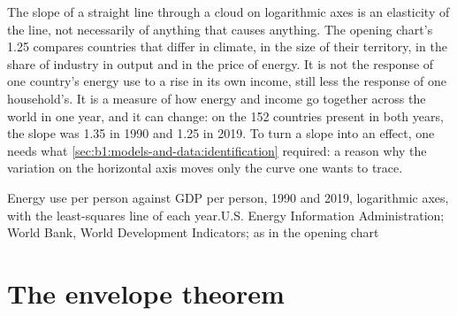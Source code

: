 \begin{measure}
The slope of a straight line through a cloud on logarithmic axes is an
elasticity of the line, not necessarily of anything that causes anything.
The opening chart's 1.25 compares countries that differ in climate, in the
size of their territory, in the share of industry in output and in the price
of energy. %
It is not the response of one country's energy use to a rise in its own
income, still less the response of one household's. It is a measure of how
energy and income go together across the world in one year, and it can
change: on the 152 countries present in both years, the slope was 1.35 in
1990 and 1.25 in 2019. %
To turn a slope into an effect, one needs what
\cref{sec:b1:models-and-data:identification} required: a reason why the
variation on the horizontal axis moves only the curve one wants to trace.
\end{measure}

\begin{omchart}{Energy use per person against GDP per person, 1990 and 2019,
logarithmic axes, with the least-squares line of each year.}{U.S. Energy
Information Administration; World Bank, World Development Indicators; as in
the opening chart}
\end{omchart}

\section{The envelope theorem}\label{sec:b1:comparative-statics:envelope}

